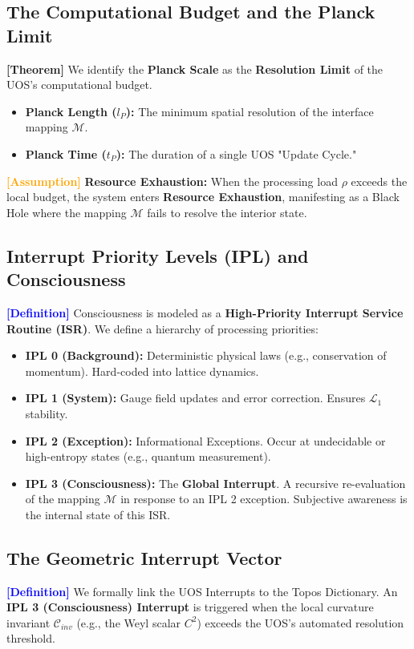 \documentclass[11pt,titlepage]{article}
\newcommand{\protocol}{\mathcal{L}_1}
\newcommand{\curvature}{\mathcal{C}}
\newcommand{\tagdef}{\textcolor{blue}{\textbf{[Definition]}} }
\newcommand{\tagass}{\textcolor{orange}{\textbf{[Assumption]}} }
\newcommand{\tagtheo}{\textcolor{green!60!black}{\textbf{[Theorem]}} }
\begin{document}
\subsection{The Computational Budget and the Planck Limit}
\tagtheo We identify the \textbf{Planck Scale} as the \textbf{Resolution Limit} of the UOS's computational budget. 
\begin{itemize}
    
\item \textbf{Planck Length ($l_P$):} The minimum spatial resolution of the interface mapping $\mathcal{M}$.
    
\item \textbf{Planck Time ($t_P$):} The duration of a single UOS "Update Cycle."
\end{itemize}
\tagass \textbf{Resource Exhaustion:} When the processing load $\rho$ exceeds the local budget, the system enters \textbf{Resource Exhaustion}, manifesting as a Black Hole where the mapping $\mathcal{M}$ fails to resolve the interior state.

\subsection{Interrupt Priority Levels (IPL) and Consciousness}
\tagdef Consciousness is modeled as a \textbf{High-Priority Interrupt Service Routine (ISR)}. We define a hierarchy of processing priorities:
\begin{itemize}
    
\item \textbf{IPL 0 (Background):} Deterministic physical laws (e.g., conservation of momentum). Hard-coded into lattice dynamics.
    
\item \textbf{IPL 1 (System):} Gauge field updates and error correction. Ensures $\protocol$ stability.
    
\item \textbf{IPL 2 (Exception):} Informational Exceptions. Occur at undecidable or high-entropy states (e.g., quantum measurement).
    
\item \textbf{IPL 3 (Consciousness):} The \textbf{Global Interrupt}. A recursive re-evaluation of the mapping $\mathcal{M}$ in response to an IPL 2 exception. Subjective awareness is the internal state of this ISR.
\end{itemize}


\subsection{The Geometric Interrupt Vector}
\tagdef We formally link the UOS Interrupts to the Topos Dictionary. An \textbf{IPL 3 (Consciousness) Interrupt} is triggered when the local curvature invariant $\curvature_{inv}$ (e.g., the Weyl scalar $C^2$) exceeds the UOS's automated resolution threshold.
\end{document}
